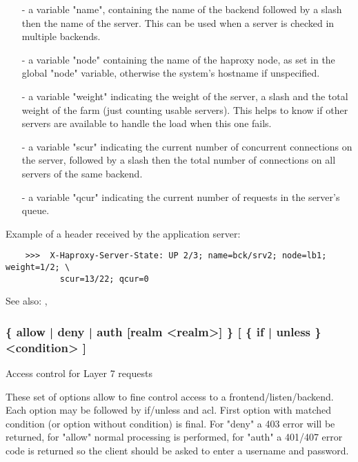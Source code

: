   \begin{itemize}
  \item[-]
      a variable "name", containing the name of the backend followed by a slash
      \chr{/} then the name of the server. This can be used when a server is
      checked in multiple backends.

  \item[-]
      a variable "node" containing the name of the haproxy node, as set in the
      global "node" variable, otherwise the system's hostname if unspecified.

  \item[-]
      a variable "weight" indicating the weight of the server, a slash \chr{/}
      and the total weight of the farm (just counting usable servers). This
      helps to know if other servers are available to handle the load when this
      one fails.

  \item[-]
      a variable "scur" indicating the current number of concurrent connections
      on the server, followed by a slash \chr{/} then the total number of
      connections on all servers of the same backend.

  \item[-]
      a variable "qcur" indicating the current number of requests in the
      server's queue.
  \end{itemize}

  Example of a header received by the application server:
  \begin{verbatim}
    >>>  X-Haproxy-Server-State: UP 2/3; name=bck/srv2; node=lb1; weight=1/2; \
           scur=13/22; qcur=0
  \end{verbatim}

  See also: , 

\subsubsection[http-request]{ \{ allow | deny | auth [realm <realm>] \} [ \{ if | unless \} <condition> ]}
\index{http-request}

  Access control for Layer 7 requests


  These set of options allow to fine control access to a
  frontend/listen/backend. Each option may be followed by if/unless and acl.
  First option with matched condition (or option without condition) is final.
  For "deny" a 403 error will be returned, for "allow" normal processing is
  performed, for "auth" a 401/407 error code is returned so the client
  should be asked to enter a username and password.

